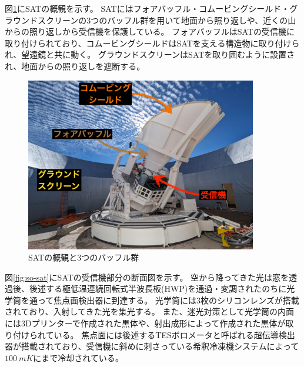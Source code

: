 \documentclass[../../main.tex]{subfiles}
\begin{document}
図\ref{fig:so-sat_overview}にSATの概観を示す。
SATにはフォアバッフル・コムービングシールド・グラウンドスクリーンの3つのバッフル群を用いて地面から照り返しや、近くの山からの照り返しから受信機を保護している\cite{Kiuchi_2020}。
フォアバッフルはSATの受信機に取り付けられており、コムービングシールドはSATを支える構造物に取り付けられ、望遠鏡と共に動く。
グラウンドスクリーンはSATを取り囲むように設置され、地面からの照り返しを遮断する。
\begin{figure}[H]
    \centering
    \includegraphics[width=0.9\textwidth]{simons_observatory/sat_overview.pdf}
    \caption{SATの概観と3つのバッフル群}
    \label{fig:so-sat_overview}
\end{figure}

図\ref{fig:so-sat}にSATの受信機部分の断面図を示す。
空から降ってきた光は窓を透過後、後述する極低温連続回転式半波長板(HWP)を通過・変調されたのちに光学筒を通って焦点面検出器に到達する。
光学筒には3枚のシリコンレンズが搭載されており、入射してきた光を集光する。
また、迷光対策として光学筒の内面には3Dプリンターで作成された黒体\cite{Adachi_2020}や、射出成形によって作成された黒体が取り付けられている。
焦点面には後述するTESボロメータと呼ばれる超伝導検出器が搭載されており、受信機に斜めに刺さっている希釈冷凍機システムによって$\SI{100}{mK}$にまで冷却されている\cite{galitzki2024simonsobservatorydesignintegration}。
\end{document}
